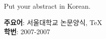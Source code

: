 \documentclass[doctor]{snuee}
\begin{document}
%
\begin{summary}
	\par    %
	Put your abstract in Korean.
	\vfill
	\begin{minipage}[t][20mm][b]{\textwidth}
		{\bfseries 주요어}: 서울대학교 논문양식, TeX\\
		{\bfseries 학번}: 2007-2007\\
	\end{minipage}
\end{summary}
\changepage {15mm}{}{}{}{}{-30mm}{}{}{15mm} %
\end{document}
